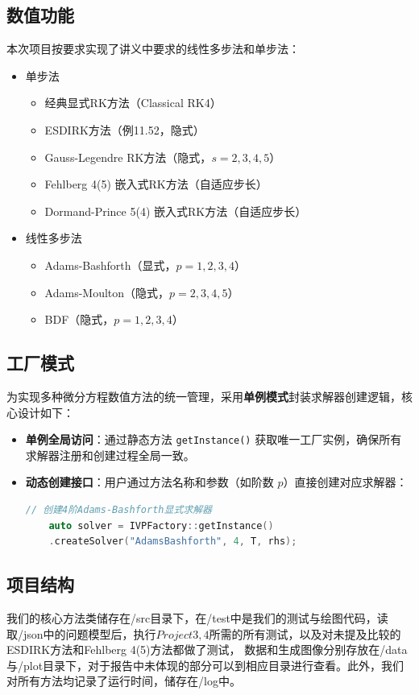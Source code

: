 \documentclass[a4paper]{ctexart} %
\begin{document}
\subsection{数值功能}
本次项目按要求实现了讲义中要求的线性多步法和单步法：
\begin{itemize}
    \item 单步法
    \begin{itemize}
        \item 经典显式RK方法（Classical RK4）
        \item ESDIRK方法（例11.52，隐式）
        \item Gauss-Legendre RK方法（隐式，$s=2,3,4,5$）
        \item Fehlberg 4(5) 嵌入式RK方法（自适应步长）
        \item Dormand-Prince 5(4) 嵌入式RK方法（自适应步长）
    \end{itemize}
    
    \item 线性多步法
    \begin{itemize}
        \item Adams-Bashforth（显式，$p=1,2,3,4$）
        \item Adams-Moulton（隐式，$p=2,3,4,5$）
        \item BDF（隐式，$p=1,2,3,4$）
    \end{itemize}
\end{itemize}

\subsection{工厂模式}
为实现多种微分方程数值方法的统一管理，采用\textbf{单例模式}封装求解器创建逻辑，核心设计如下：

\begin{itemize}
\item \textbf{单例全局访问}：通过静态方法 \texttt{getInstance()} 获取唯一工厂实例，确保所有求解器注册和创建过程全局一致。
\item \textbf{动态创建接口}：用户通过方法名称和参数（如阶数 $p$）直接创建对应求解器：
\begin{lstlisting}[language=C++, basicstyle=\ttfamily\small]
    // 创建4阶Adams-Bashforth显式求解器
    auto solver = IVPFactory::getInstance()
    .createSolver("AdamsBashforth", 4, T, rhs);
\end{lstlisting}
\end{itemize}

\subsection{项目结构}
我们的核心方法类储存在/src目录下，在/test中是我们的测试与绘图代码，读取/json中的问题模型后，执行$Project3,4$所需的所有测试，以及对未提及比较的ESDIRK方法和Fehlberg 4(5)方法都做了测试，
数据和生成图像分别存放在/data与/plot目录下，对于报告中未体现的部分可以到相应目录进行查看。此外，我们对所有方法均记录了运行时间，储存在/log中。
\end{document}
